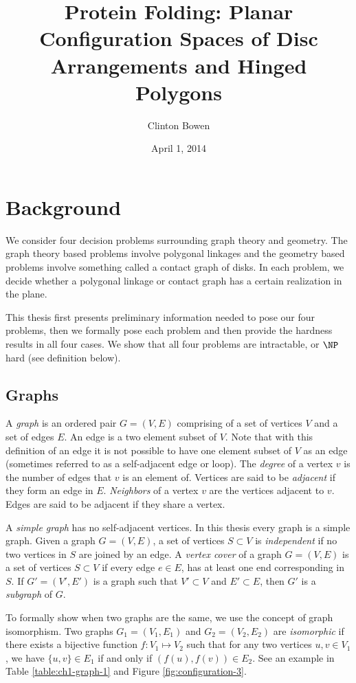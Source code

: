\documentclass[10pt]{CSUNthesis}
\author{Clinton Bowen}
\title{Protein Folding: Planar Configuration Spaces of Disc Arrangements and
Hinged Polygons}
\date{April 1, 2014}
\theoremstyle{plain}%
\theoremstyle{definition}
\theoremstyle{remark}
\begin{document}
\chapter{Background}

We consider four decision problems surrounding graph theory and geometry. 
The graph theory based problems involve polygonal linkages and the geometry based problems involve something called a contact graph of disks.  
In each problem, we decide whether a polygonal linkage or contact graph has a certain realization in the plane.

This thesis first presents preliminary information needed to pose our four problems, then we formally pose each problem and then provide the hardness results in all four cases.
We show that all four problems are intractable, or $\NP$ hard (see definition below). 
\section{Graphs}
A \textit{graph} is an ordered pair $G = (V,E)$ comprising of a set of vertices $V$ and a set of edges $E$.  
An edge is a two element subset of $V$.
Note that with this definition of an edge it is not possible to have one element subset of $V$ as an edge (sometimes referred to as a self-adjacent edge or loop).
The \textit{degree} of a vertex $v$ is the number of edges that $v$ is an element of.   
Vertices are said to be \textit{adjacent} if they form an edge in $E$.  
\textit{Neighbors} of a vertex $v$ are the vertices adjacent to $v$.  
Edges are said to be adjacent if they share a vertex.  

A \textit{simple graph} has no self-adjacent vertices.
In this thesis every graph is a simple graph.
Given a graph $G = (V,E)$, a set of vertices $S \subset V$ is \textit{independent} if no two vertices in $S$ are joined by an edge. 
A \textit{vertex cover} of a graph $G = (V,E)$  is a set of vertices $S \subset V$ if every edge $e \in E$, has at least one end corresponding in $S$.
If $G' = (V',E')$ is a graph such that $V' \subset V$ and $E' \subset E$, then $G'$ is a \textit{subgraph} of $G$.

To formally show when two graphs are the same, we use the concept of graph isomorphism.
Two graphs $G_1 =(V_1,E_1)$ and $G_2 = (V_2,E_2) $ are \textit{isomorphic} if there exists a bijective function $f: V_1 \mapsto V_2$ such that for any two vertices $u,v \in V_1$, we have $\{u, v\} \in E_1$ if and only if $(f(u),f(v)) \in E_2$. 
See an example in Table \ref{table:ch1-graph-1} and Figure \ref{fig:configuration-3}.
\end{document}
